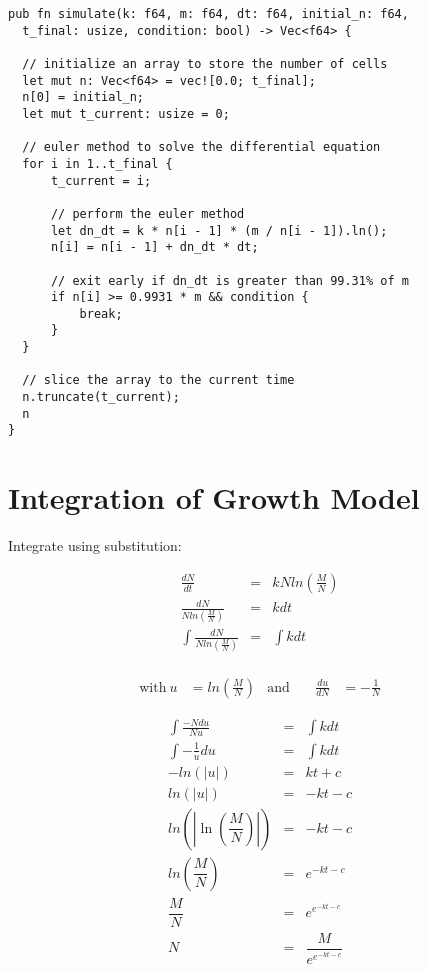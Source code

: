 \clearpage

\begin{lstlisting}[caption=Growth Model (Rust), label={lst:growthModel},captionpos=b]
pub fn simulate(k: f64, m: f64, dt: f64, initial_n: f64,
  t_final: usize, condition: bool) -> Vec<f64> {
    
  // initialize an array to store the number of cells
  let mut n: Vec<f64> = vec![0.0; t_final];
  n[0] = initial_n;
  let mut t_current: usize = 0;

  // euler method to solve the differential equation
  for i in 1..t_final {
      t_current = i;

      // perform the euler method
      let dn_dt = k * n[i - 1] * (m / n[i - 1]).ln();
      n[i] = n[i - 1] + dn_dt * dt;

      // exit early if dn_dt is greater than 99.31% of m
      if n[i] >= 0.9931 * m && condition {
          break;
      }
  }
  
  // slice the array to the current time
  n.truncate(t_current);
  n
}
\end{lstlisting}


\clearpage

\section{Integration of Growth Model} \label{sec:substitution}

Integrate using substitution:

\begin{eqnarray*}
\frac{dN}{dt}                                &=& kNln\left(\frac{M}{N} \right) \\
\frac{dN}{Nln\left(\frac{M}{N} \right)}      &=& kdt \\
\int \frac{dN}{Nln\left(\frac{M}{N} \right)} &=& \int kdt \\
\end{eqnarray*}

\begin{align*}
\text{with}\ u &= ln\left(\frac{M}{N} \right) & \text{and}\ && \frac{du}{dN} &= -\frac{1}{N}
\end{align*}

\begin{eqnarray*}
\int \frac{-Ndu}{Nu} &=& \int kdt \\
\int -\frac{1}{u}du &=& \int kdt \\
-ln\left(|{u}| \right) &=& kt + c \\
ln\left(|{u}| \right) &=& -kt - c \\
ln\left(\left|\ln\left(\dfrac{M}{N}\right)\right|\right) &=& -kt - c \\
ln\left(\dfrac{M}{N}\right) &=& e^{-kt - c} \\
\dfrac{M}{N}                &=& e^{e^{-kt - c}} \\
N                           &=& \dfrac{M}{e^{e^{-kt - c}}}
\end{eqnarray*}


